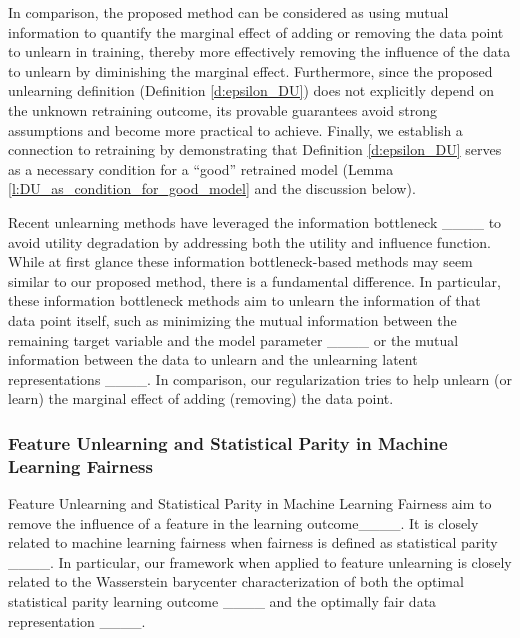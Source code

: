 In comparison, the proposed method can be considered as using mutual information to quantify the marginal effect of adding or removing the data point to unlearn in training, thereby more effectively removing the influence of the data to unlearn by diminishing the marginal effect. Furthermore, since the proposed unlearning definition (Definition \ref{d:epsilon_DU}) does not explicitly depend on the unknown retraining outcome, its provable guarantees avoid strong assumptions and become more practical to achieve. Finally, we establish a connection to retraining by demonstrating that Definition \ref{d:epsilon_DU} serves as a necessary condition for a “good” retrained model (Lemma \ref{l:DU_as_condition_for_good_model} and the discussion below).

Recent unlearning methods have leveraged the information bottleneck ____ to avoid utility degradation by addressing both the utility and influence function. While at first glance these information bottleneck-based methods may seem similar to our proposed method, there is a fundamental difference. In particular, these information bottleneck methods aim to unlearn the information of that data point itself, such as minimizing the mutual information between the remaining target variable and the model parameter ____ or the mutual information between the data to unlearn and the unlearning latent representations ____. In comparison, our regularization tries to help unlearn (or learn) the marginal effect of adding (removing) the data point.

\subsubsection{Feature Unlearning and Statistical Parity in Machine Learning Fairness}

Feature Unlearning and Statistical Parity in Machine Learning Fairness aim to remove the influence of a feature in the learning outcome____. It is closely related to machine learning fairness when fairness is defined as statistical parity ____. In particular, our framework when applied to feature unlearning is closely related to the Wasserstein barycenter characterization of both the optimal statistical parity learning outcome ____ and the optimally fair data representation ____.

